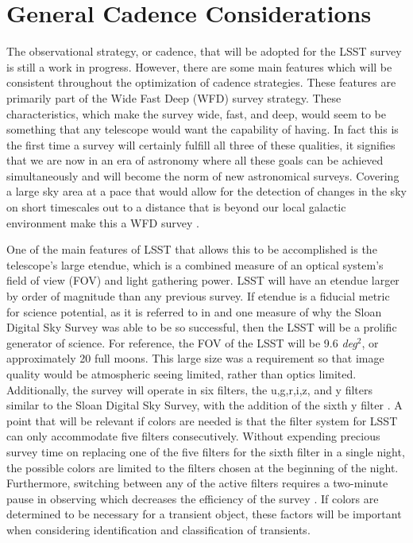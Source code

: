 \documentclass[12pt]{article}
\begin{document}
\section{General Cadence Considerations} %
The observational strategy, or cadence, that will be adopted for the LSST survey is still a work in progress. However, there are some main features which will be consistent throughout the optimization of cadence strategies. These features are primarily part of the Wide Fast Deep (WFD) survey strategy. These characteristics, which make the survey wide, fast, and deep, would seem to be something that any telescope would want the capability of having. In fact this is the first time a survey will certainly fulfill all three of these qualities, it signifies that we are now in an era of astronomy where all these goals can be achieved simultaneously and will become the norm of new astronomical surveys. Covering a large sky area at a pace that would allow for the detection of changes in the sky on short timescales out to a distance that is beyond our local galactic environment make this a WFD survey \citep{LSSTScienceCollaboration2009}. \par
One of the main features of LSST that allows this to be accomplished is the telescope's large etendue, which is a combined measure of an optical system's field of view (FOV) and light gathering power. LSST will have an etendue larger by order of magnitude than any previous survey. If etendue is a fiducial metric for science potential, as it is referred to in \cite{LSSTScienceCollaboration2009} and one measure of why the Sloan Digital Sky Survey was able to be so successful, then the LSST will be a prolific generator of science. For reference, the FOV of the LSST will be 9.6 \textit{deg}$^2$, or approximately 20 full moons. This large size was a requirement so that image quality would be atmospheric seeing limited, rather than optics limited. Additionally, the survey will operate in six filters, the u,g,r,i,z, and y filters similar to the Sloan Digital Sky Survey, with the addition of the sixth y filter \citep{LSSTScienceCollaboration2009}. A point that will be relevant if colors are needed is that the filter system for LSST can only accommodate five filters consecutively. Without expending precious survey time on replacing one of the five filters for the sixth filter in a single night, the possible colors are limited to the filters chosen at the beginning of the night. Furthermore, switching between any of the active filters requires a two-minute pause in observing which decreases the efficiency of the survey \citep{LSSTScienceCollaboration2017}. If colors are determined to be necessary for a transient object, these factors will be important when considering identification and classification of transients. \par
\end{document}
